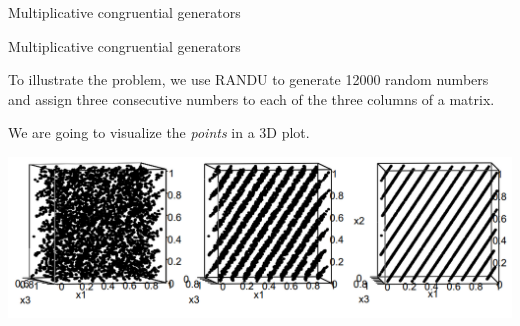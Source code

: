 \begin{vbframe}{Multiplicative congruential generators}

\end{vbframe}

\begin{vbframe}{Multiplicative congruential generators}

To illustrate the problem, we use RANDU to generate 12000 random numbers and assign three consecutive numbers to each of the three columns of a matrix.


We are going to visualize the
\emph{points} in a 3D plot.






\vspace*{1cm}

\begin{center}
\includegraphics{figure_man/randu.png}
\end{center}



\end{vbframe}
